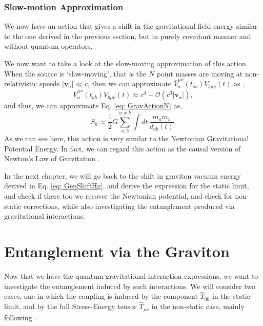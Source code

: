 \documentclass[12pt,a4paper]{report}
\theoremstyle{plain}
\theoremstyle{definition}
\theoremstyle{remark}
\newcommand{\munu}{\mu\nu}
\begin{document}
\subsection{Slow-motion Approximation} \label{subsec: Slomo}
We now have an action that gives a shift in the gravitational field energy similar to the one derived in the previous section, but in purely covariant manner and without quantum operators. 

We now want to take a look at the slow-moving approximation of this action. When the source is `slow-moving', that is the $N$ point masses are moving at non-relativistic speeds $|\bm{v}_a| \ll c$, then we can approximate $\bar{V}_a^{\munu}(t_{ab}) V_{b\munu}(t)$ as \cite{Christodoulou_2023b},
\begin{equation}
    \bar{V}_a^{\munu}(t_{ab}) V_{b\munu}(t) \approx c^4 + \mathcal{O}(c^3|\bm{v}_a|),
\end{equation}
and thus, we can approximate Eq. \ref{eq: GravActionN} as,
\begin{equation}
    S_{h} \approx \frac{1}{2} G \sum_{a,b}^{a \neq b}  \int \! dt \, \frac{m_a m_b}{d_{ab}(t)}.
\end{equation}
As we can see here, this action is very similar to the Newtonian Gravitational Potential Energy. In fact, we can regard this action as the causal version of Newton's Law of Gravitation \cite{Christodoulou_2023b}.

In the next chapter, we will go back to the shift in graviton vacuum energy derived in Eq. \ref{eq: GenShiftHg}, and derive the expression for the static limit, and check if there too we recover the Newtonian potential, and check for non-static corrections, while also investigating the entanglement produced via gravitational interactions.

\newpage
\chapter{Entanglement via the Graviton} \label{chap: Entanglement}
Now that we have the quantum gravitational interaction expressions, we want to investigate the entanglement induced by such interactions. We will consider two cases, one in which the coupling is induced by the component $\hat{T}_{00}$ in the static limit, and by the full Stress-Energy tensor $\hat{T}_{\munu}$ in the non-static case,  mainly following \citet{Bose_2022}.
\end{document}
